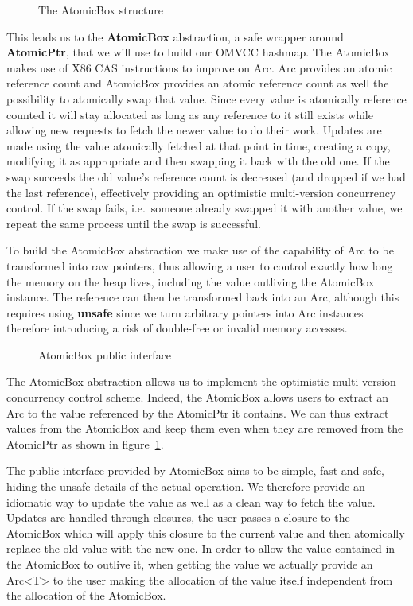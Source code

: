 \begin{figure}[htb!]
  
  \caption{The AtomicBox structure}
\end{figure}

This leads us to the \textbf{AtomicBox} abstraction, a safe wrapper
around \textbf{AtomicPtr}, that we will use to build our OMVCC
hashmap. The AtomicBox makes use of X86 CAS instructions to improve on
Arc. Arc provides an atomic reference count and AtomicBox provides an
atomic reference count as well the possibility to atomically swap that
value. Since every value is atomically reference counted it will stay
allocated as long as any reference to it still exists while allowing
new requests to fetch the newer value to do their work. Updates are
made using the value atomically fetched at that point in time,
creating a copy, modifying it as appropriate and then swapping it back
with the old one. If the swap succeeds the old value's reference count
is decreased (and dropped if we had the last reference), effectively
providing an optimistic multi-version concurrency control. If the swap
fails, i.e.\ someone already swapped it with another value, we repeat
the same process until the swap is successful.

To build the AtomicBox abstraction we make use of the capability of
Arc to be transformed into raw pointers, thus allowing a user to
control exactly how long the memory on the heap lives, including the
value outliving the AtomicBox instance. The reference can then be
transformed back into an Arc, although this requires using
\textbf{unsafe} since we turn arbitrary pointers into Arc instances
therefore introducing a risk of double-free or invalid memory
accesses.

\begin{figure}[htb!]
  \label{fig:aboxinterface}
  
  \caption{AtomicBox public interface}
\end{figure}

The AtomicBox abstraction allows us to implement the optimistic
multi-version concurrency control scheme. Indeed, the AtomicBox allows
users to extract an Arc to the value referenced by the AtomicPtr it
contains. We can thus extract values from the AtomicBox and keep them
even when they are removed from the AtomicPtr as shown in
figure~\ref{fig:aboxinterface}.

The public interface provided by AtomicBox aims to be simple, fast and
safe, hiding the unsafe details of the actual operation. We therefore
provide an idiomatic way to update the value as well as a clean way to
fetch the value. Updates are handled through closures, the user passes
a closure to the AtomicBox which will apply this closure to the
current value and then atomically replace the old value with the new
one. In order to allow the value contained in the AtomicBox to outlive
it, when getting the value we actually provide an Arc<T> to the user
making the allocation of the value itself independent from the
allocation of the AtomicBox.

